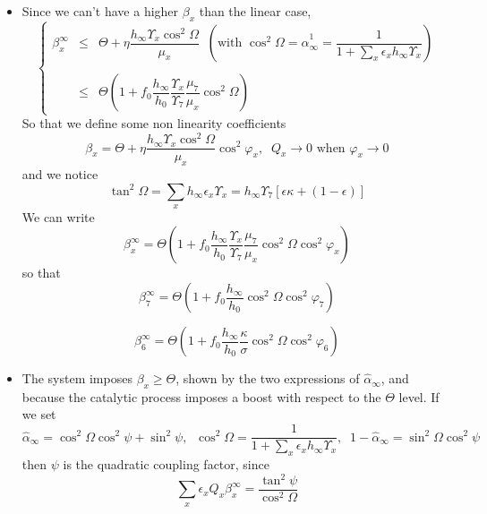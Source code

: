 \documentclass[aps,onecolumn,10pt]{revtex4}
\begin{document}
\begin{itemize}
\item Since we can't have a higher $\beta_x$ than the linear case,
\begin{equation}
\left\lbrace
\begin{array}{rcl}
\beta_x^\infty & \leq & \Theta + \eta \dfrac{h_\infty\Upsilon_x\cos^2\Omega}{\mu_x}\;\;\left(\text{with }\cos^2\Omega=\hat\alpha_\infty^1=\dfrac{1}{1+\sum_x\epsilon_x h_\infty \Upsilon_x}\right)\\
\\
&\leq& \Theta\left(1+ f_0 \dfrac{h_\infty}{h_0} \dfrac{\Upsilon_x}{\Upsilon_7}\dfrac{\mu_7}{\mu_x}\cos^2 \Omega \right)
\end{array}
\right.
\end{equation}
So that we define some non linearity coefficients
\begin{equation}
	\beta_x = \Theta + \eta \dfrac{h_\infty\Upsilon_x\cos^2\Omega}{\mu_x} \cos^2 \varphi_x,\;\;Q_x\to0\text{ when }\varphi_x\to0
\end{equation}
and we notice
\begin{equation}
	\tan^2 \Omega = \sum_x h_\infty \epsilon_x \Upsilon_x = h_\infty \Upsilon_7 \left[\epsilon\kappa+(1-\epsilon)\right]
\end{equation}
We can write
\begin{equation}
	\beta_x^\infty = \Theta \left(1 + f_0 \dfrac{h_\infty}{h_0} \dfrac{\Upsilon_x}{\Upsilon_7}\dfrac{\mu_7}{\mu_x}\cos^2 \Omega\cos^2 \varphi_x\right)
\end{equation}
so that
\begin{equation}
	\beta_7^\infty = \Theta \left(1 + 
	f_0 \dfrac{h_\infty}{h_0} 	\cos^2\Omega \cos^2\varphi_7
	\right)
\end{equation}

\begin{equation}
	\beta_6^\infty = \Theta \left(1 + f_0 \dfrac{h_\infty}{h_0} \dfrac{\kappa}{\sigma}
	\cos^2\Omega \cos^2\varphi_6 
	\right)
\end{equation}


\item The system imposes $\beta_x\geq\Theta$, shown by the two expressions of $\hat\alpha_\infty$, and because the catalytic process imposes a boost with respect to the $\Theta$ level.
If we set
\begin{equation}
	\hat\alpha_\infty = \cos^2\Omega \cos^2\psi + \sin^2\psi, 
	\;\;\cos^2\Omega  = \dfrac{1}{1+\sum_x\epsilon_x h_\infty \Upsilon_x},\;\;1-\hat\alpha_\infty = \sin^2\Omega  \cos^2\psi
\end{equation}
then $\psi$ is the quadratic coupling factor, since
\begin{equation}
	\sum_x \epsilon_x Q_x \beta_x^\infty = \dfrac{\tan^2\psi}{\cos^2\Omega}
\end{equation}


\end{itemize}
\end{document}
